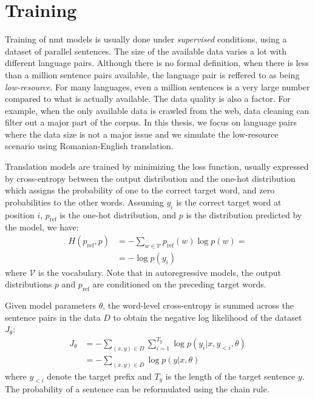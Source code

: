 \section{Training}
\label{sec:training}

Training of \gls{nmt} models is usually done under \emph{supervised}
conditions, using a dataset of parallel sentences.  The size of the available data varies a lot with
different language pairs. Although there is no formal definition, when there is
less than a million sentence pairs available, the language pair is reffered to
as being \emph{low-resource}. For many languages, even a million sentences is a
very large number compared to what is actually available. The data quality is
also a factor. For example, when the only available data is crawled from the
web, data cleaning can filter out a major part of the corpus. In this thesis,
we focus on language pairs where the data size is not a major issue and we
simulate the low-resource scenario using Romanian-English translation.

Translation models are trained by minimizing the loss function, usually
expressed by cross-entropy between the output distribution and the one-hot
distribution which assigns the probability of one to the correct target word,
and zero probabilities to the other words. Assuming $y_i$ is the correct target
word at position $i$, $p_{\text{ref}}$ is the one-hot distribution, and $p$ is
the distribution predicted by the model, we have:
%
\begin{equation}
  \begin{split}
    H(p_{\text{ref}}, p) &=  - \sum_{w \in \mathcal{V}} p_{\text{ref}}(w) \log p(w) = \\
    &=  - \log p(y_i)
  \end{split}
\end{equation}
%
where $\mathcal{V}$ is the vocabulary. Note that in autoregressive models, the
output distributions $p$ and $p_{\text{ref}}$ are conditioned on the preceding
target words.

Given model parameters $\theta$, the word-level cross-entropy is summed across
the sentence pairs in the data $D$ to obtain the negative log likelihood of the
dataset $J_{\theta}$:
%
\begin{equation}
  \begin{split}
  J_{\theta} &= - \sum_{(x, y) \in D} \sum_{i = 1}^{T_y} \log p(y_i | x, y_{<i}, \theta) \\
  &= - \sum_{(x, y) \in D} \log p(y | x, \theta)
  \end{split}
\end{equation}
%
where $y_{<i}$ denote the target prefix and $T_{y}$ is the length of the target
sentence $y$. The probability of a sentence can be reformulated using the chain
rule.

